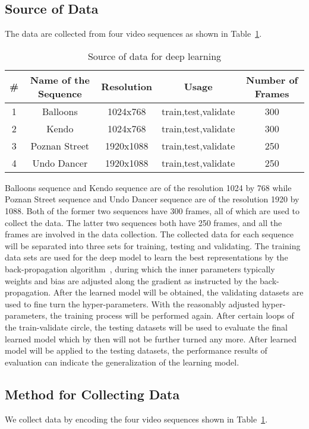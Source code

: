 \subsection{Source of Data}\label{subsec:source-of-data}
The data are collected from four video sequences as shown in
Table~\ref{tab:data-source}.
\begin{table}[t]
    \caption{Source of data for deep learning}
    \bigskip
    \label{tab:data-source}
    \centering
    \begin{tabular}{c c c c c}
        \hline
        \# & Name of the Sequence & Resolution & Usage & Number of Frames\\
        \hline
        1 & Balloons & 1024x768 & train,test,validate & 300\\
        2 & Kendo & 1024x768 & train,test,validate & 300\\
        3 & Poznan Street & 1920x1088 & train,test,validate & 250\\
        4 & Undo Dancer & 1920x1088 & train,test,validate & 250\\
        \hline
    \end{tabular}
\end{table}
Balloons sequence and Kendo sequence are of the resolution 1024 by 768 while
Poznan Street sequence and Undo Dancer sequence are of the resolution 1920
by 1088.
Both of the former two sequences have 300 frames, all of which are used to
collect the data.
The latter two sequences both have 250 frames, and all the frames are involved
in the data collection.
The collected data for each sequence will be separated into three sets
for training, testing and validating.
The training data sets are used for the deep model to learn the best
representations by the back-propagation algorithm~\parencite{RN204},
during which the inner parameters typically weights and bias are adjusted
along the gradient as instructed by the back-propagation.
After the learned model will be obtained, the validating datasets are used to
fine turn the hyper-parameters.
With the reasonably adjusted hyper-parameters, the training process will be
performed again.
After certain loops of the train-validate circle, the testing datasets will
be used to evaluate the final learned model which by then
will not be further turned any more.
After learned model will be applied to the testing datasets, the performance
results of evaluation can indicate the generalization of the learning model.

\subsection{Method for Collecting Data}\label{subsec:collecting-method}
We collect data by encoding the four video sequences shown in
Table~\ref{tab:data-source}.

